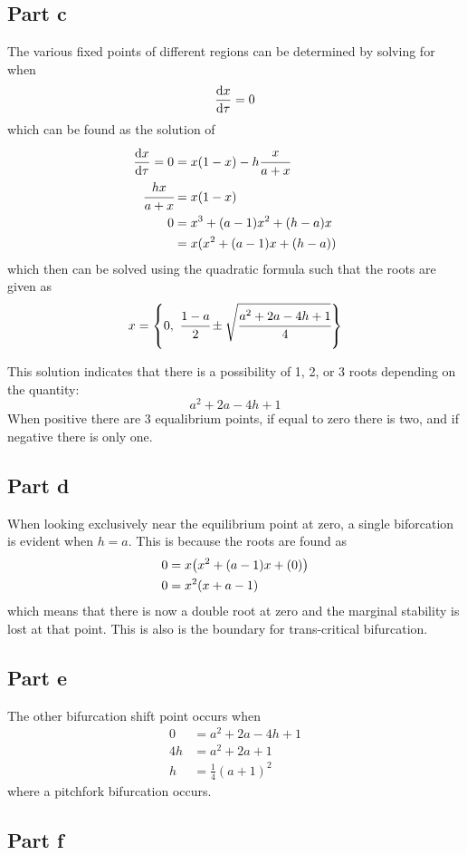 \documentclass[letter]{article}
\begin{document}
\subsection{Part c}
The various fixed points of different regions can be determined by solving for when $$\dv{x}{\tau} = 0$$ which can be found as the solution of 
\begin{align}
	\dv{x}{\tau} = 0
	&= x (1-x) - h \cfrac{x}{a+x}\\
	\cfrac{hx}{a+x} &= x (1-x)\\
	0 &= x^3 + (a-1) x^2 + (h-a) x\\
	&= x (x^2 + (a-1) x + (h-a))
	\end{align}
which then can be solved using the quadratic formula such that the roots are given as
\begin{equation}
	x = \qty{0, \ \cfrac{1-a}{2} \pm \sqrt{\cfrac{a^2 + 2a - 4h +1}{4}}}
\end{equation}

This solution indicates that there is a possibility of 1, 2, or 3 roots depending on the quantity: $$a^2 + 2a - 4h + 1$$ When positive there are 3 equalibrium points, if equal to zero there is two, and if negative there is only one.

\subsection{Part d}
When looking exclusively near the equilibrium point at zero, a single biforcation is evident when $h = a$. This is because the roots are found as
\begin{align}
	0 &= x \qty(x^2 + (a-1)x + (0))\\
	0 &= x^2 (x + a-1)
\end{align}
which means that there is now a double root at zero and the marginal stability is lost at that point. This is also is the boundary for trans-critical bifurcation.

\subsection{Part e}
The other bifurcation shift point occurs when
\begin{align}
	0 &= a^2 + 2a - 4h + 1\\
	4h &= a^2 + 2a + 1\\
	h &= \frac{1}{4} (a+1)^2
\end{align}
where a pitchfork bifurcation occurs.

\newpage
\subsection{Part f}
\end{document}
